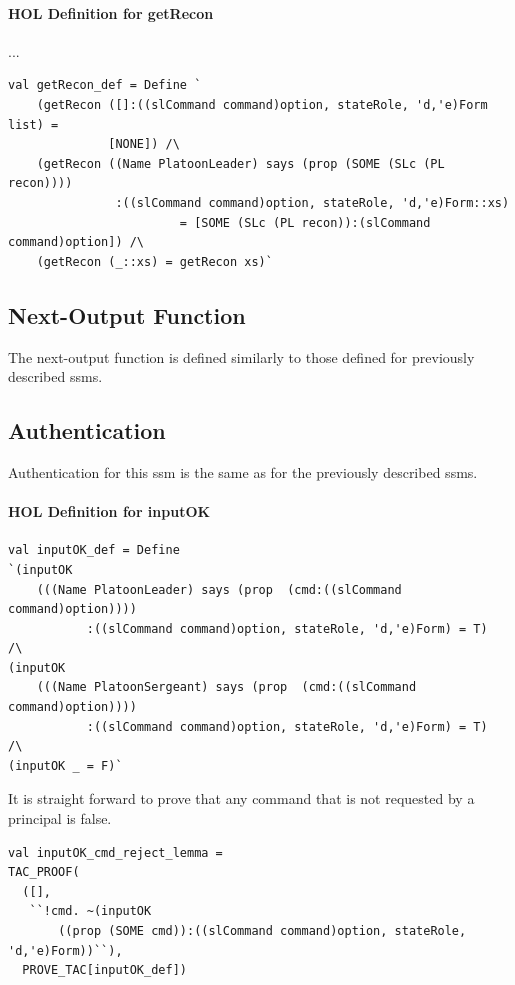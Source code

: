 \documentclass[../../main/main.tex]{subfiles}
\begin{document}
\paragraph*{HOL Definition for getRecon}...

\begin{lstlisting}
val getRecon_def = Define `
    (getRecon ([]:((slCommand command)option, stateRole, 'd,'e)Form list) =
    	      [NONE]) /\
    (getRecon ((Name PlatoonLeader) says (prop (SOME (SLc (PL recon))))
               :((slCommand command)option, stateRole, 'd,'e)Form::xs)
    	      	        = [SOME (SLc (PL recon)):(slCommand command)option]) /\
    (getRecon (_::xs) = getRecon xs)`
\end{lstlisting}

\subsection{Next-Output Function}
The next-output function is defined similarly to those defined for previously described \glspl{ssm}.

\HOLThmTag{ssmPlanPB}{planPBOut_def}\HOLssmPlanPBTheoremsplanPBOutXXdef


\subsection{Authentication}
Authentication for this \gls{ssm} is the same as for the previously described \glspl{ssm}.

\paragraph*{HOL Definition for inputOK}

\begin{lstlisting}
val inputOK_def = Define
`(inputOK
	(((Name PlatoonLeader) says (prop  (cmd:((slCommand command)option))))
	       :((slCommand command)option, stateRole, 'd,'e)Form) = T)  /\
(inputOK
	(((Name PlatoonSergeant) says (prop  (cmd:((slCommand command)option))))
	       :((slCommand command)option, stateRole, 'd,'e)Form) = T)  /\
(inputOK _ = F)`
\end{lstlisting}

It is straight forward to prove that any command that is not requested by a principal is false.

\begin{lstlisting}
val inputOK_cmd_reject_lemma =
TAC_PROOF(
  ([],
   ``!cmd. ~(inputOK
   	   ((prop (SOME cmd)):((slCommand command)option, stateRole, 'd,'e)Form))``),
  PROVE_TAC[inputOK_def])
\end{lstlisting}
\end{document}
